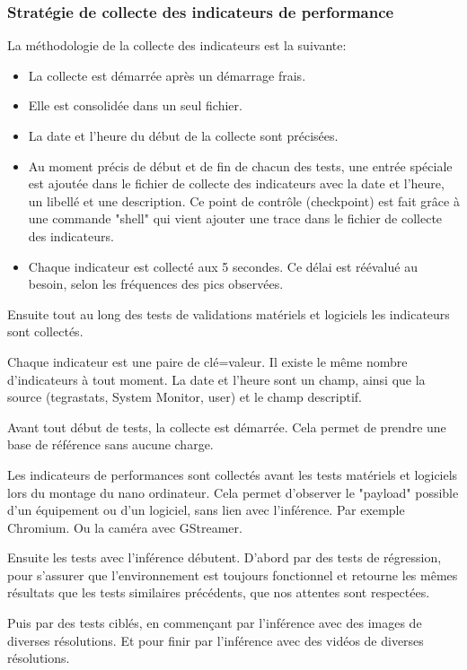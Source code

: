 \subsubsection{Stratégie de collecte des indicateurs de performance}
\par La méthodologie de la collecte des indicateurs est la suivante: 
\begin{itemize}
    \item La collecte est démarrée après un démarrage frais.
    \item Elle est consolidée dans un seul fichier.
    \item La date et l'heure du début de la collecte sont précisées.
    \item Au moment précis de début et de fin de chacun des tests, une entrée spéciale est ajoutée dans le fichier de collecte des indicateurs avec la date et l'heure, un libellé et une description. Ce point de contrôle (checkpoint) est fait grâce à une commande "shell" qui vient ajouter une trace dans le fichier de collecte des indicateurs.
    \item Chaque indicateur est collecté aux 5 secondes. Ce délai est réévalué au besoin, selon les fréquences des pics observées. 
\end{itemize}
\par Ensuite tout au long des tests de validations matériels et logiciels les indicateurs sont collectés. 
\par Chaque indicateur est une paire de clé=valeur. Il existe le même nombre d'indicateurs à tout moment. La date et l'heure sont un champ, ainsi que la source (tegrastats, System Monitor, user) et le champ descriptif. 
\par Avant tout début de tests, la collecte est démarrée. Cela permet de prendre une base de référence sans aucune charge.
\par Les indicateurs de performances sont collectés avant les tests matériels et logiciels lors du montage du nano ordinateur. Cela permet d'observer le "payload" possible d'un équipement ou d'un logiciel, sans lien avec l'inférence. Par exemple Chromium. Ou la caméra avec GStreamer. 
\par Ensuite les tests avec l'inférence débutent. D'abord par des tests de régression, pour s'assurer que l'environnement est toujours fonctionnel et retourne les mêmes résultats que les tests similaires précédents, que nos attentes sont respectées. 
\par Puis par des tests ciblés, en commençant par l'inférence avec des images de diverses résolutions. Et pour finir par l'inférence avec des vidéos de diverses résolutions. 
